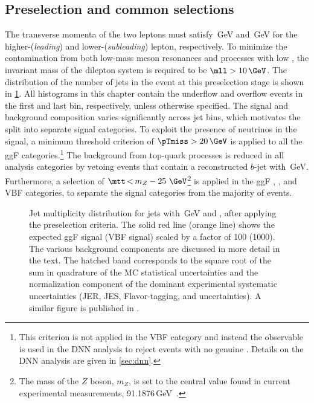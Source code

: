 \subsection{Preselection and common selections}
\label{subsec:preselection}
The transverse momenta of the two leptons must satisfy \,GeV and \,GeV for the higher-\pT (\emph{leading}) and lower-\pT (\emph{subleading}) lepton, respectively.
To minimize the contamination from both low-mass meson resonances and \Ztautau processes with low \mll, the invariant mass of the dilepton system is required to be $\mll > 10\,\GeV$.
The distribution of the number of jets in the event at this preselection stage is shown in \cref{fig:njet-dist}.
All histograms in this chapter contain the underflow and overflow events in the first and last bin, respectively, unless otherwise specified.
The signal and background composition varies significantly across jet bins, which motivates the split into separate \Njet signal categories.
To exploit the presence of neutrinos in the signal, a minimum threshold criterion of $\pTmiss > 20\,\GeV$ is applied to all the ggF categories.\footnote{This criterion is not applied in the VBF category and instead the \METSig observable is used in the DNN analysis to reject events with no genuine \MET. Details on the DNN analysis are given in \cref{sec:dnn}.} 
The background from top-quark processes is reduced in all analysis categories by vetoing events that contain a reconstructed $b$-jet with \,GeV.
Furthermore, a selection of $\mtt\,{<}\,m_Z - 25~\GeV$\footnote{The mass of the $Z$ boson, $m_Z$, is set to the central value found in current experimental measurements, 91.1876\,GeV~\cite{PDG2020}.} is applied in the ggF \OneJet, \TwoJet, and VBF \TwoJet categories, to separate the signal categories from the majority of \Zgamma events.

\begin{figure}[t]
  \caption[Jet multiplicity distribution after the preselection.]{Jet multiplicity distribution for jets with \,GeV and , after applying the preselection criteria. The solid red line (orange line) shows the expected ggF signal (VBF signal) scaled by a factor of 100 (1000). The various background components are discussed in more detail in the text. 
  The hatched band corresponds to the square root of the sum in quadrature of the MC statistical uncertainties and the normalization component of the dominant experimental systematic uncertainties (JER, JES, Flavor-tagging, and \MET uncertainties). 
  A similar figure is published in .}
  \label{fig:njet-dist}
\end{figure}

